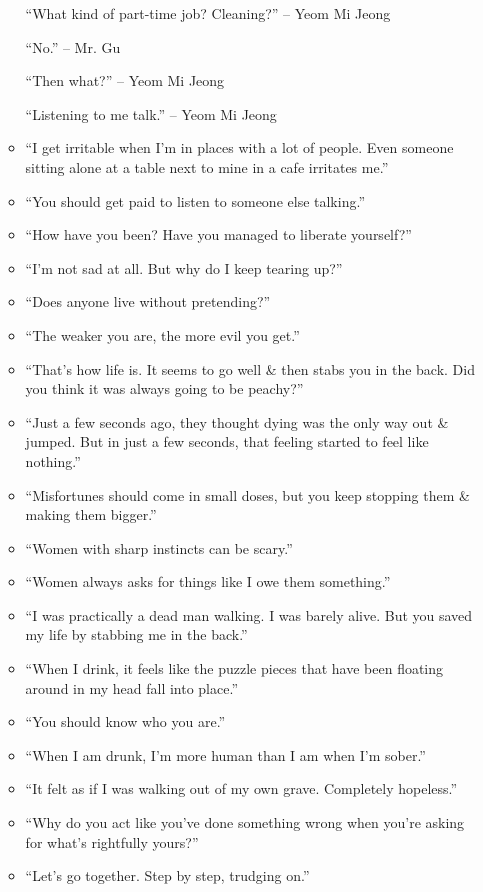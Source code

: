 \documentclass[oneside]{book}
\numberwithin{equation}{section}
\begin{document}
\begin{enumerate}
\begin{itemize}
		``What kind of part-time job? Cleaning?'' -- Yeom Mi Jeong
		
		``No.'' -- Mr. Gu
		
		``Then what?'' -- Yeom Mi Jeong
		
		``Listening to me talk.'' -- Yeom Mi Jeong
		\item ``I get irritable when I'm in places with a lot of people. Even someone sitting alone at a table next to mine in a cafe irritates me.''
		\item ``You should get paid to listen to someone else talking.''
		\item ``How have you been? Have you managed to liberate yourself?''
		\item ``I'm not sad at all. But why do I keep tearing up?''
		\item ``Does anyone live without pretending?''
		\item ``The weaker you are, the more evil you get.''
		\item ``That's how life is. It seems to go well \& then stabs you in the back. Did you think it was always going to be peachy?''
		\item ``Just a few seconds ago, they thought dying was the only way out \& jumped. But in just a few seconds, that feeling started to feel like nothing.''
		\item ``Misfortunes should come in small doses, but you keep stopping them \& making them bigger.''
		\item ``Women with sharp instincts can be scary.''
		\item ``Women always asks for things like I owe them something.''
		\item ``I was practically a dead man walking. I was barely alive. But you saved my life by stabbing me in the back.''
		\item ``When I drink, it feels like the puzzle pieces that have been floating around in my head fall into place.''
		\item ``You should know who you are.''
		\item ``When I am drunk, I'm more human than I am when I'm sober.''
		\item ``It felt as if I was walking out of my own grave. Completely hopeless.''
		\item ``Why do you act like you've done something wrong when you're asking for what's rightfully yours?''
		\item ``Let's go together. Step by step, trudging on.''
	\end{itemize}

\end{enumerate}
\end{document}
